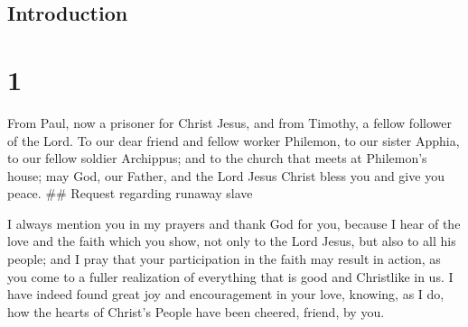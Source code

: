\hypertarget{introduction}{%
\subsection{Introduction}\label{introduction}}

\hypertarget{section}{%
\section{1}\label{section}}

 From Paul, now a prisoner for Christ Jesus, and from
Timothy, a fellow follower of the Lord.  To our dear friend
and fellow worker Philemon, to our sister Apphia, to our fellow soldier
Archippus; and to the church that meets at Philemon's house;
 may God, our Father, and the Lord Jesus Christ bless you
and give you peace. \#\# Request regarding runaway slave

 I always mention you in my prayers and thank God for you,
 because I hear of the love and the faith which you show,
not only to the Lord Jesus, but also to all his people;  and
I pray that your participation in the faith may result in action, as you
come to a fuller realization of everything that is good and Christlike
in us.  I have indeed found great joy and encouragement in
your love, knowing, as I do, how the hearts of Christ's People have been
cheered, friend, by you.

